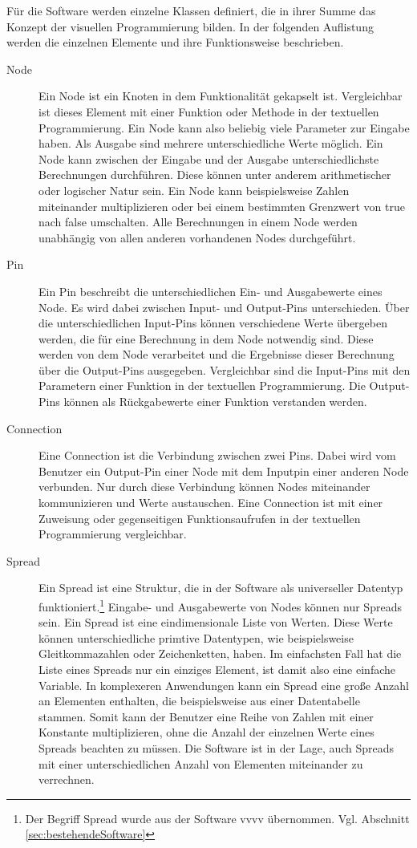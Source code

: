 \documentclass[a4paper, 
               12pt,
               DIV=calc,
               version=first,
               pdftex,
               headsepline,
               footsepline,
               bibtotocnumbered,
               liststotocnumbered]{scrreprt}
\begin{document}
Für die Software werden einzelne Klassen definiert, die in ihrer Summe das Konzept der visuellen
Programmierung bilden. In der folgenden Auflistung werden die einzelnen
Elemente und ihre Funktionsweise beschrieben.
\begin{description}
\item[Node]
Ein Node ist ein Knoten in dem Funktionalität gekapselt ist. Vergleichbar ist dieses
Element mit einer Funktion oder Methode in der textuellen Programmierung. Ein Node kann also
beliebig viele Parameter zur Eingabe haben. Als Ausgabe sind mehrere unterschiedliche Werte möglich.
Ein Node kann zwischen der Eingabe und der Ausgabe unterschiedlichste Berechnungen durchführen.
Diese können unter anderem arithmetischer oder logischer Natur sein. Ein Node kann beispielsweise
Zahlen miteinander multiplizieren oder bei einem bestimmten Grenzwert von true nach false
umschalten.
Alle Berechnungen in einem Node werden unabhängig von allen anderen vorhandenen Nodes durchgeführt.
\item[Pin]
Ein Pin beschreibt die unterschiedlichen Ein- und Ausgabewerte eines Node.
Es wird dabei zwischen Input- und Output-Pins unterschieden. Über die unterschiedlichen
Input-Pins können verschiedene Werte übergeben werden, die für eine Berechnung in dem Node notwendig sind.
Diese werden von dem Node verarbeitet und die Ergebnisse dieser Berechnung
über die Output-Pins ausgegeben.
Vergleichbar sind die Input-Pins mit den Parametern einer Funktion in der textuellen Programmierung.
Die Output-Pins können als Rückgabewerte einer Funktion verstanden werden.
\item[Connection]
Eine Connection ist die Verbindung zwischen zwei Pins. Dabei wird vom Benutzer ein Output-Pin einer
Node mit dem Inputpin einer anderen Node verbunden. Nur durch diese Verbindung können
Nodes miteinander kommunizieren und Werte austauschen. Eine Connection
ist mit einer Zuweisung oder gegenseitigen Funktionsaufrufen in der textuellen Programmierung vergleichbar.
\item[Spread]
Ein Spread ist eine Struktur, die in der Software als universeller Datentyp funktioniert.\footnote{Der
Begriff Spread wurde aus der Software vvvv übernommen. Vgl. Abschnitt \ref{sec:bestehendeSoftware}}
Eingabe- und Ausgabewerte von Nodes können nur Spreads sein. Ein Spread ist eine 
eindimensionale Liste von Werten. Diese Werte können unterschiedliche primtive Datentypen,
wie beispielsweise Gleitkommazahlen oder Zeichenketten, haben. Im einfachsten Fall hat
die Liste eines Spreads nur ein einziges Element, ist damit also eine einfache Variable. In komplexeren
Anwendungen kann ein Spread eine große Anzahl an Elementen enthalten, die beispielsweise
aus einer Datentabelle stammen. Somit kann der Benutzer eine Reihe von Zahlen mit
einer Konstante multiplizieren, ohne die Anzahl der einzelnen Werte eines Spreads
beachten zu müssen. Die Software ist in der Lage, auch Spreads mit einer unterschiedlichen
Anzahl von Elementen miteinander zu verrechnen.
\end{description}
\end{document}
